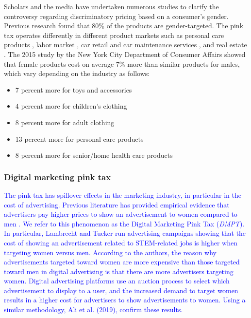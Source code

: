 \documentclass[twocolumn]{bmcart}\usepackage{lineno}
\begin{document}
Scholars and the media have undertaken numerous studies to clarify the controversy regarding discriminatory pricing based on a consumer's gender. Previous research found that 80\% of the products are gender-targeted. The pink tax operates differently in different product markets such as personal care products \cite{guittar2022beyond,duesterhaus2011cost}, labor market \cite{blau2017rthe}, car retail and car maintenance services \cite{morton2003consumer,busse2017repairing,goldberg1996dealer,ayres1995race,ayres1991fair}, and real estate \cite{goldsmith2020gender}. The 2015 study by the New York City Department of Consumer Affairs \cite{abdou2019gender}  showed that female products cost on average 7\% more than similar products for males, which vary depending on the industry as follows:
\begin{itemize}
    \item 7 percent more for toys and accessories
    \item 4 percent more for children's clothing
    \item 8 percent more for adult clothing
    \item 13 percent more for personal care products
    \item 8 percent more for senior/home health care products    
\end{itemize} 


\subsubsection{Digital marketing pink tax}

\textcolor{blue}{The pink tax has spillover effects in the marketing industry, in particular in the cost of advertising. Previous literature has provided empirical evidence that advertisers pay higher prices to show an advertisement to women compared to men \cite{lambrecht2019algorithmic}. We refer to this phenomenon as the Digital Marketing Pink Tax (\emph{DMPT}). In particular, Lambrecht and Tucker \cite{lambrecht2019algorithmic} run advertising campaigns showing that the cost of showing an advertisement related to STEM-related jobs is higher when targeting women versus men. According to the authors, the reason why advertisements targeted toward women are more expensive than those targeted toward men in digital advertising is that there are more advertisers targeting women. Digital advertising platforms use an auction process to select which advertisement to display to a user, and the increased demand to target women results in a higher cost for advertisers to show advertisements to women. Using a similar methodology, Ali et al. (2019),  \cite{ali2019discrimination} confirm these results.}
\end{document}
